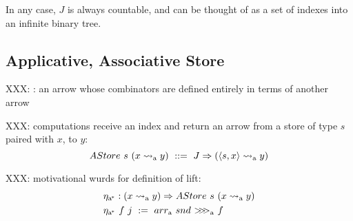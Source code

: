 \documentclass[preprint]{sigplanconf}
\newcommand{\arrow}{\rightsquigarrow}
\newcommand{\arrowarr}{\ensuremath{arr}}
\newcommand{\arrowcomp}{\ensuremath{{>}\mspace{-6mu}{>}\mspace{-6mu}{>}}}
\newcommand{\arrowtrans}{\ensuremath{\eta}}
\newcommand{\gen}{_\mathrm{a}}
\newcommand{\genc}{_\mathrm{a^{\mspace{-2mu}*}}}
\begin{document}
In any case, $J$ is always countable, and can be thought of as a set of indexes into an infinite binary tree.

\subsection{Applicative, Associative Store}

XXX: : an arrow whose combinators are defined entirely in terms of another arrow

XXX: computations receive an index and return an arrow from a store of type $s$ paired with $x$, to $y$:
\begin{equation}
	AStore~s~(x \arrow\gen y) \ ::= \ J \tto (\pair{s,x} \arrow\gen y)
\end{equation}

XXX: motivational wurds for definition of lift:
\begin{equation}
\begin{aligned}
	&\arrowtrans\genc : (x \arrow\gen y) \tto AStore~s~(x \arrow\gen y) \\
	&\arrowtrans\genc~f~j \ := \ \arrowarr\gen~snd~\arrowcomp\gen~f
\end{aligned}
\end{equation}
\end{document}
